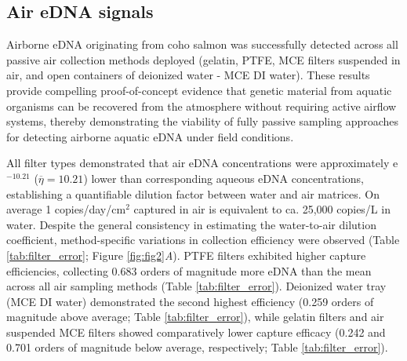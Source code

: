\documentclass{article}
\begin{document}
\subsection{Air eDNA signals}
Airborne eDNA originating from coho salmon was successfully detected across all passive air collection methods deployed (gelatin, PTFE, MCE filters suspended in air, and open containers of deionized water - MCE DI water). These results provide compelling proof-of-concept evidence that genetic material from aquatic organisms can be recovered from the atmosphere without requiring active airflow systems, thereby demonstrating the viability of fully passive sampling approaches for detecting airborne aquatic eDNA under field conditions.


All filter types demonstrated that air eDNA concentrations were approximately e$^{-10.21}$ ($\overline \eta = 10.21$) lower than corresponding aqueous eDNA concentrations, establishing a quantifiable dilution factor between water and air matrices. On average 1 copies/day/cm$^2$ captured in air is equivalent to ca. 25,000 copies/L in water. Despite the general consistency in estimating the water-to-air dilution coefficient, method-specific variations in collection efficiency were observed (Table \ref{tab:filter_error}; Figure \ref{fig:fig2}\textit{A}). PTFE filters exhibited higher capture efficiencies, collecting 0.683 orders of magnitude more eDNA than the mean across all air sampling methods (Table \ref{tab:filter_error}). Deionized water tray (MCE DI water) demonstrated the second highest efficiency (0.259 orders of magnitude above average; Table \ref{tab:filter_error}), while gelatin filters and air suspended MCE filters showed comparatively lower capture efficacy (0.242 and 0.701 orders of magnitude below average, respectively; Table \ref{tab:filter_error}).
\end{document}
